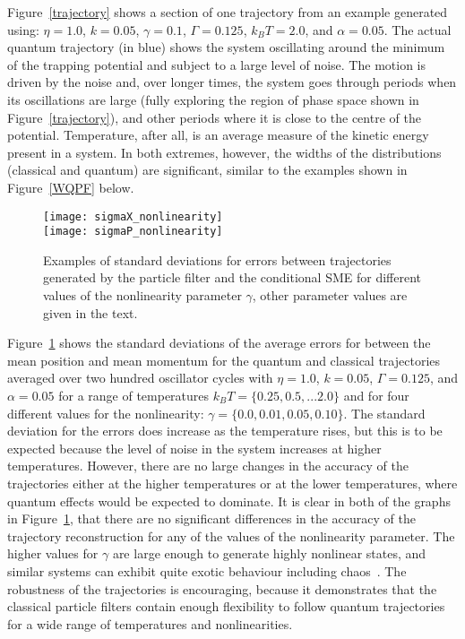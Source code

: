 \documentclass[conference]{IEEEtran}
\begin{document}
Figure~\ref{trajectory} shows a section of one trajectory from an example generated using: $\eta = 1.0$, $k = 0.05$, $\gamma = 0.1$, $\Gamma = 0.125$, $k_B T = 2.0$, and $\alpha = 0.05$. The actual quantum trajectory (in blue) shows the system oscillating around the minimum of the trapping potential and subject to a large level of noise. The motion is driven by the noise and, over longer times, the system goes through periods when its oscillations are large (fully exploring the region of phase space shown in Figure~\ref{trajectory}), and other periods where it is close to the centre of the potential. Temperature, after all, is an average measure of the kinetic energy present in a system. In both extremes, however, the widths of the distributions (classical and quantum) are significant, similar to the examples shown in Figure~\ref{WQPF} below. 

\begin{figure}[htbp]
       \centering
		\texttt{[image: sigmaX\_nonlinearity]} \\
		\texttt{[image: sigmaP\_nonlinearity]} 
	\caption{\label{errors} Examples of standard deviations for errors between trajectories generated by the particle filter and the conditional SME for different values of the nonlinearity parameter $\gamma$, other parameter values are given in the text.}
\end{figure}
Figure~\ref{errors} shows the standard deviations of the average errors for between the mean position and mean momentum for the quantum and classical trajectories averaged over two hundred oscillator cycles with $\eta = 1.0$, $k = 0.05$, $\Gamma = 0.125$, and $\alpha = 0.05$ for a range of temperatures $k_B T = \{0.25, 0.5,...2.0\}$ and for four different values for the nonlinearity: $\gamma = \{0.0, 0.01, 0.05, 0.10\}$. The standard deviation for the errors does increase as the temperature rises, but this is to be expected because the level of noise in the system increases at higher temperatures. However, there are no large changes in the accuracy of the trajectories either at the higher temperatures or at the lower temperatures, where quantum effects would be expected to dominate. It is clear in both of the graphs in Figure~\ref{errors}, that there are no significant differences in the accuracy of the trajectory reconstruction for any of the values of the nonlinearity parameter. The higher values for $\gamma$ are large enough to generate highly nonlinear states, and similar systems can exhibit quite exotic behaviour including chaos~\cite{Bru1996}. The robustness of the trajectories is encouraging, because it demonstrates that the classical particle filters contain enough flexibility to follow quantum trajectories for a wide range of temperatures and nonlinearities.
\end{document}
